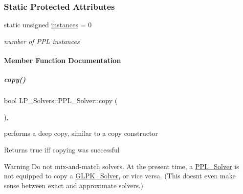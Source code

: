 \subsubsection*{Static Protected Attributes}
\begin{DoxyCompactItemize}
\item 
\mbox{\label{group___c_l_s_solvers_a4c6a4a141e8c2eb4adbdef6ad73cec21}} 
static unsigned \hyperlink{group___c_l_s_solvers_a4c6a4a141e8c2eb4adbdef6ad73cec21}{instances} = 0
\begin{DoxyCompactList}\small\item\em number of P\+PL instances \end{DoxyCompactList}\end{DoxyCompactItemize}


\paragraph{Member Function Documentation}
\mbox{\label{group___c_l_s_solvers_acc03418759754dbeda266dba9eefe98b}} 
\subparagraph{\texorpdfstring{copy()}{copy()}}
{\footnotesize\ttfamily bool L\+P\+\_\+\+Solvers\+::\+P\+P\+L\+\_\+\+Solver\+::copy (\begin{DoxyParamCaption}\item[{const \hyperlink{group___c_l_s_solvers_class_l_p___solvers_1_1_l_p___solver}{L\+P\+\_\+\+Solver} $\ast$}]{ }\end{DoxyParamCaption})\hspace{0.3cm}{\ttfamily [override]}, {\ttfamily [virtual]}}



performs a deep copy, similar to a copy constructor 

\begin{DoxyReturn}{Returns}
{\ttfamily true} iff copying was successful 
\end{DoxyReturn}
\begin{DoxyWarning}{Warning}
Do not mix-\/and-\/match solvers. At the present time, a \hyperlink{group___c_l_s_solvers_class_l_p___solvers_1_1_p_p_l___solver}{P\+P\+L\+\_\+\+Solver} is not equipped to copy a \hyperlink{group___c_l_s_solvers_class_l_p___solvers_1_1_g_l_p_k___solver}{G\+L\+P\+K\+\_\+\+Solver}, or vice versa. (This doesn\textquotesingle{}t even make sense between exact and approximate solvers.) 
\end{DoxyWarning}


